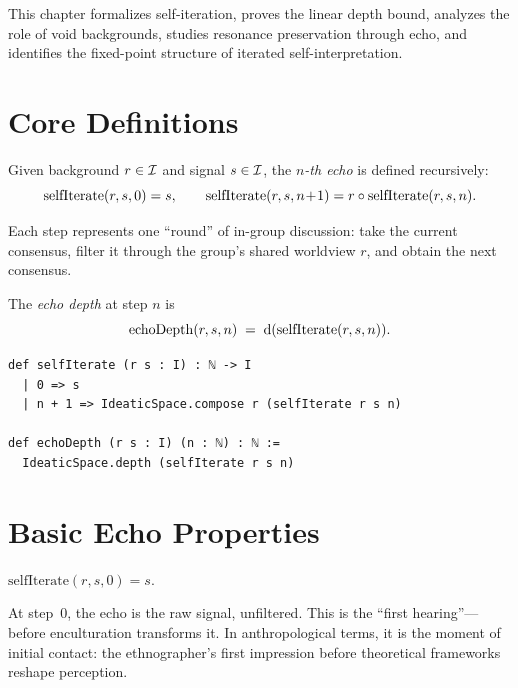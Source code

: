 This chapter formalizes self-iteration, proves the linear depth bound,
analyzes the role of void backgrounds, studies resonance preservation
through echo, and identifies the fixed-point structure of iterated
self-interpretation.


\section{Core Definitions}
\label{sec:echo-defs}

\begin{definition}
\label{def:self-iterate}
Given background $r\in\mathcal{I}$ and signal $s\in\mathcal{I}$, the \emph{$n$-th echo}
is defined recursively:
\[
  \mathrm{selfIterate}(r,s,0) = s,
  \qquad
  \mathrm{selfIterate}(r,s,n\!+\!1) = r\circ\mathrm{selfIterate}(r,s,n).
\]
\end{definition}

Each step represents one ``round'' of in-group discussion: take the current
consensus, filter it through the group's shared worldview $r$, and obtain
the next consensus.

\begin{definition}
\label{def:echo-depth}
The \emph{echo depth} at step $n$ is
\[
  \mathrm{echoDepth}(r,s,n) \;=\; \operatorname{d}(\mathrm{selfIterate}(r,s,n)).
\]
\end{definition}

\begin{lstlisting}[caption={Self-iteration in Lean~4.}]
def selfIterate (r s : I) : ℕ -> I
  | 0 => s
  | n + 1 => IdeaticSpace.compose r (selfIterate r s n)

def echoDepth (r s : I) (n : ℕ) : ℕ :=
  IdeaticSpace.depth (selfIterate r s n)
\end{lstlisting}


\section{Basic Echo Properties}
\label{sec:echo-basic}

\begin{theorem}
\label{thm:echo-base}
$\mathrm{selfIterate}(r, s, 0) = s.$
\end{theorem}

At step~0, the echo is the raw signal, unfiltered.  This is the ``first
hearing''---before enculturation transforms it.  In anthropological terms,
it is the moment of initial contact: the ethnographer's first impression
before theoretical frameworks reshape perception.

